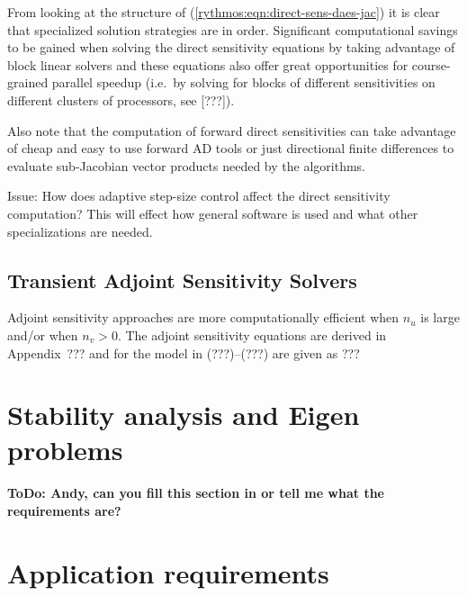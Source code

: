 \documentclass[pdf,ps2pdf,11pt]{SANDreport}
\begin{document}
From looking at the structure of (\ref{rythmos:eqn:direct-sens-daes-jac}) it
is clear that specialized solution strategies are in order.  Significant
computational savings to be gained when solving the direct sensitivity
equations by taking advantage of block linear solvers and these equations also
offer great opportunities for course-grained parallel speedup (i.e.\ by
solving for blocks of different sensitivities on different clusters of
processors, see [???]).

Also note that the computation of forward direct sensitivities can take
advantage of cheap and easy to use forward AD tools or just directional finite
differences to evaluate sub-Jacobian vector products needed by the algorithms.

Issue: How does adaptive step-size control affect the direct sensitivity
computation?  This will effect how general software is used and what other
specializations are needed.

\subsection{Transient Adjoint Sensitivity Solvers}

Adjoint sensitivity approaches are more computationally efficient when $n_u$
is large and/or when $n_v > 0$.  The adjoint sensitivity equations are derived in
Appendix~??? and for the model in (???)--(???) are given as
%
???
%

\section{Stability analysis and Eigen problems}

{}\textbf{ToDo: Andy, can you fill this section in or tell me what the
requirements are?}

\section{Application requirements}
\end{document}
